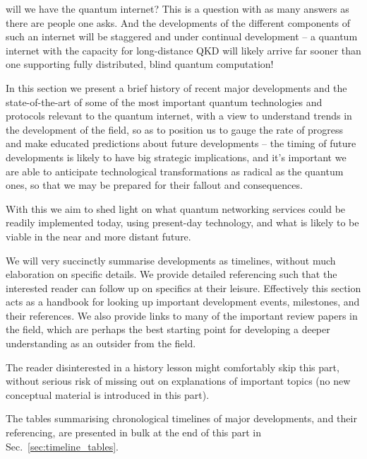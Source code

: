 %
%


\newline

\startnormtable

 will we have the quantum internet? This is a question with as many answers as there are people one asks. And the developments of the different components of such an internet will be staggered and under continual development -- a quantum internet with the capacity for long-distance QKD will likely arrive far sooner than one supporting fully distributed, blind quantum computation!

In this section we present a brief history of recent major developments and the state-of-the-art of some of the most important quantum technologies and protocols relevant to the quantum internet, with a view to understand trends in the development of the field, so as to position us to gauge the rate of progress and make educated predictions about future developments -- the timing of future developments is likely to have big strategic implications, and it's important we are able to anticipate technological transformations as radical as the quantum ones, so that we may be prepared for their fallout and consequences.

With this we aim to shed light on what quantum networking services could be readily implemented today, using present-day technology, and what is likely to be viable in the near and more distant future.

We will very succinctly summarise developments as timelines, without much elaboration on specific details. We provide detailed referencing such that the interested reader can follow up on specifics at their leisure. Effectively this section acts as a handbook for looking up important development events, milestones, and their references. We also provide links to many of the important review papers in the field, which are perhaps the best starting point for developing a deeper understanding as an outsider from the field.

The reader disinterested in a history lesson might comfortably skip this part, without serious risk of missing out on explanations of important topics (no new conceptual material is introduced in this part).

The tables summarising chronological timelines of major developments, and their referencing, are presented in bulk at the end of this part in Sec.~\ref{sec:timeline_tables}.

